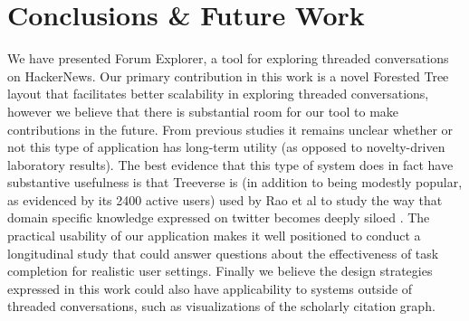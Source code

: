 \documentclass{egpubl}
\begin{document}
\section{Conclusions \& Future Work}
We have presented Forum Explorer, a tool for exploring threaded conversations on HackerNews. 
%
Our primary contribution in this work is a novel Forested Tree layout that facilitates better scalability in exploring threaded conversations, however we believe that there is substantial room for our tool to make contributions in the future.
%
From previous studies it remains unclear whether or not this type of application has long-term utility (as opposed to novelty-driven laboratory results).
%
The best evidence that this type of system does in fact have substantive usefulness is that Treeverse is (in addition to being modestly popular, as evidenced by its 2400 active users) used by Rao et al to study the way that domain specific knowledge expressed on twitter becomes deeply siloed \cite{twittercanoes}.
%
The practical usability of our application makes it well positioned to conduct a longitudinal study that could answer questions about the effectiveness of task completion for realistic user settings.
%
Finally we believe the design strategies expressed in this work could also have applicability to systems outside of threaded conversations, such as visualizations of the scholarly citation graph.










%



\end{document}
